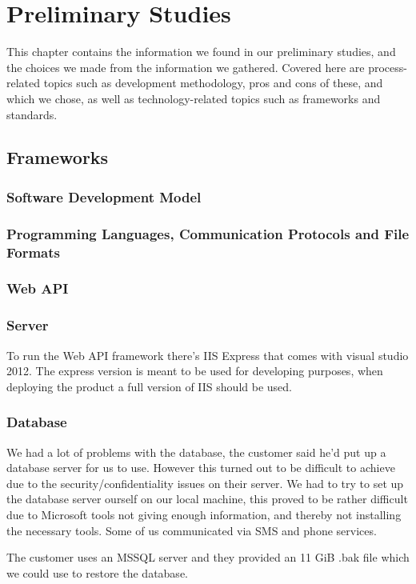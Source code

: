 \chapter{Preliminary Studies}
This chapter contains the information we found in our preliminary studies, and the choices we made from the information we gathered. Covered here are process-related topics such as development methodology, pros and cons of these, and which we chose, as well as technology-related topics such as frameworks and standards.
\newpage


\newpage

\section{Frameworks}
\subsection{Software Development Model}
\subsection{Programming Languages, Communication Protocols and File Formats}
\subsection{Web API}
\subsection{Server}
To run the Web API framework there's IIS Express that comes with visual studio 2012. The express version is meant to be used for developing purposes, when deploying the product a full version of IIS should be used.
\subsection{Database}
We had a lot of problems with the database, the customer said he'd put up a database server for us to use. However this turned out to be difficult to achieve due to the security/confidentiality issues on their server. We had to try to set up the database server ourself on our local machine, this proved to be rather difficult due to Microsoft tools not giving enough information, and thereby not installing the necessary tools. Some of us communicated via SMS and phone services.

The customer uses an MSSQL server and they provided an 11 GiB .bak file which we could use to restore the database.

